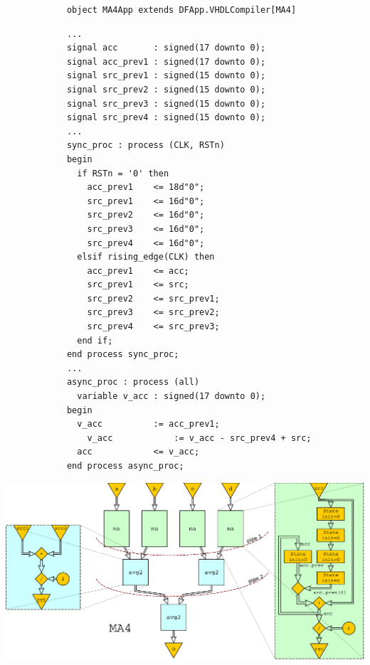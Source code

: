 \begin{table}[t!]
\begin{minipage}[t][11.8cm][t]{0.505\linewidth}
\begin{verbatim}
			object MA4App extends DFApp.VHDLCompiler[MA4]
    \end{verbatim}
    \label{fig:MADFiant}
  \end{minipage}
  \hfill
  \begin{minipage}[t][11.8cm][t]{0.49\linewidth}
    \centering
    \captionsetup{justification=centering}
		\begin{verbatim}
			...
			signal acc       : signed(17 downto 0);
			signal acc_prev1 : signed(17 downto 0);
			signal src_prev1 : signed(15 downto 0);
			signal src_prev2 : signed(15 downto 0);
			signal src_prev3 : signed(15 downto 0);
			signal src_prev4 : signed(15 downto 0);
			...
			sync_proc : process (CLK, RSTn)
			begin
			  if RSTn = '0' then
			    acc_prev1    <= 18d"0";
			    src_prev1    <= 16d"0";
			    src_prev2    <= 16d"0";
			    src_prev3    <= 16d"0";
			    src_prev4    <= 16d"0";
			  elsif rising_edge(CLK) then
			    acc_prev1    <= acc;
			    src_prev1    <= src;
			    src_prev2    <= src_prev1;
			    src_prev3    <= src_prev2;
			    src_prev4    <= src_prev3;
			  end if;
			end process sync_proc;
			...
			async_proc : process (all)
			  variable v_acc : signed(17 downto 0);
			begin
			  v_acc          := acc_prev1;
				v_acc 		     := v_acc - src_prev4 + src;
			  acc            <= v_acc;
			end process async_proc;
    \end{verbatim}
    \label{fig:MAVHDL}
  \end{minipage}
  \includegraphics[width=0.92\linewidth]{graphics/ma.pdf}
  \captionsetup{justification=centering}

\end{table}
